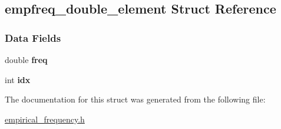 \hypertarget{structempfreq__double__element}{}\subsection{empfreq\+\_\+double\+\_\+element Struct Reference}
\label{structempfreq__double__element}
\subsubsection*{Data Fields}
\begin{DoxyCompactItemize}
\item 
\mbox{\label{structempfreq__double__element_af87b5aceec8f23e1c13f1d818adbb93b}} 
double {\bfseries freq}
\item 
\mbox{\label{structempfreq__double__element_a200ef26955bf526fd4ccb916d797a9c7}} 
int {\bfseries idx}
\end{DoxyCompactItemize}


The documentation for this struct was generated from the following file\+:\begin{DoxyCompactItemize}
\item 
\hyperlink{empirical__frequency_8h}{empirical\+\_\+frequency.\+h}\end{DoxyCompactItemize}
